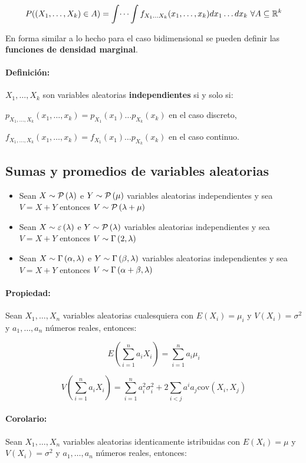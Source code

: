 $$P((X_1,\dots,X_k)\in A) = \int\dots\int f_{X_1\dots X_k}(x_1,\dots,x_k)dx_1\dots dx_k~\forall A\subseteq \mathbb{R}^k$$

En forma similar a lo hecho para el caso bidimensional se pueden definir las \textbf{funciones de densidad marginal}.

\paragraph{Definición:} $X_1,\dots,X_k$ son variables aleatorias \textbf{independientes} si y solo si:

$p_{X_1,\dots,X_k}(x_1,\dots,x_k) = p_{X_1}(x_1)\dots p_{X_k}(x_k)$ en  el  caso discreto,

$f_{X_1,\dots,X_k}(x_1,\dots,x_k) = f_{X_1}(x_1)\dots p_{X_k}(x_k)$ en  el  caso continuo.


\subsection{Sumas y promedios de variables aleatorias}
\begin{itemize}
	\item Sean  $X\sim \mathcal{P}\left(\lambda\right)$ e $Y\sim \mathcal{P}\left(\mu\right)$ variables aleatorias independientes y sea $V = X + Y$ entonces $V\sim \mathcal{P}\left(\lambda + \mu\right)$
	\item Sean  $X\sim \varepsilon\left(\lambda\right)$ e $Y\sim \mathcal{P}\left(\lambda\right)$ variables aleatorias independientes y sea $V = X + Y$ entonces $V\sim \Gamma\left(2,\lambda\right)$
	\item Sean  $X\sim \Gamma\left(\alpha,\lambda\right)$ e $Y\sim \Gamma\left(\beta,\lambda\right)$ variables aleatorias independientes y sea $V = X + Y$ entonces $V\sim \Gamma\left(\alpha+\beta,\lambda\right)$
\end{itemize}

\paragraph{Propiedad:} Sean $X_1,\dots,X_n$ variables aleatorias cualesquiera con $E(X_i) = \mu_i$ y $V(X_i)=\sigma^2$ y $a_1,\dots,a_n$ números reales, entonces:


$$E\left(\sum_{i=1}^{n} a_iX_i\right) = \sum_{i=1}^{n} a_i\mu_i $$

$$V\left(\sum_{i=1}^{n} a_iX_i\right) = \sum_{i=1}^{n} a^2_i\sigma^2_i + 2\sum_{i<j} a^ia_j\text{cov}(X_i, X_j)$$

\paragraph{Corolario:} Sean $X_1,\dots,X_n$ variables aleatorias identicamente istribuidas con $E(X_i) = \mu$ y $V(X_i)=\sigma^2$ y $a_1,\dots,a_n$ números reales, entonces:


